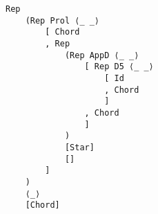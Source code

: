 \centering
\begin{verbatim}
Rep 
    (Rep Prol ⟨_ _⟩
        [ Chord
        , Rep 
            (Rep AppD ⟨_ _⟩ 
                [ Rep D5 ⟨_ _⟩ 
                    [ Id
                    , Chord
                    ]
                , Chord
                ]
            ) 
            [Star] 
            []
        ]
    ) 
    ⟨_⟩
    [Chord]
\end{verbatim}
\caption{}
\label{}